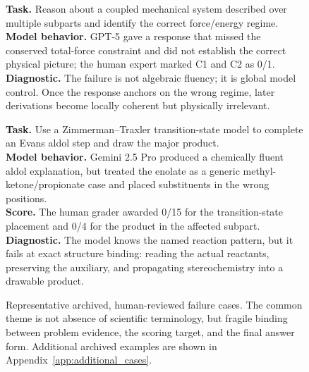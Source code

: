 \documentclass[11pt]{article}
\begin{document}
\begin{figure}[t]
\centering
\begin{tcolorbox}[
  title={Case A: Global physical invariant missed after fluent local reasoning (IPhO 2025 S2 C1--C2)},
  colback=gray!3,
  colframe=black!35,
  boxrule=0.6pt,
  arc=1.5mm,
  left=1.5mm,right=1.5mm,top=1mm,bottom=1mm
]
\footnotesize
\textbf{Task.} Reason about a coupled mechanical system described over multiple subparts and identify the correct force/energy regime.\\
\textbf{Model behavior.} GPT-5 gave a response that missed the conserved total-force constraint and did not establish the correct physical picture; the human expert marked C1 and C2 as 0/1.\\
\textbf{Diagnostic.} The failure is not algebraic fluency; it is global model control. Once the response anchors on the wrong regime, later derivations become locally coherent but physically irrelevant.
\end{tcolorbox}

\vspace{-0.5em}

\begin{tcolorbox}[
  title={Case B: Stereochemical template applied to the wrong substrate (IChO 2025 Q2.2a--b)},
  colback=gray!3,
  colframe=black!35,
  boxrule=0.6pt,
  arc=1.5mm,
  left=1.5mm,right=1.5mm,top=1mm,bottom=1mm
]
\footnotesize
\textbf{Task.} Use a Zimmerman--Traxler transition-state model to complete an Evans aldol step and draw the major product.\\
\textbf{Model behavior.} Gemini 2.5 Pro produced a chemically fluent aldol explanation, but treated the enolate as a generic methyl-ketone/propionate case and placed substituents in the wrong positions.\\
\textbf{Score.} The human grader awarded 0/15 for the transition-state placement and 0/4 for the product in the affected subpart.\\
\textbf{Diagnostic.} The model knows the named reaction pattern, but it fails at exact structure binding: reading the actual reactants, preserving the auxiliary, and propagating stereochemistry into a drawable product.
\end{tcolorbox}

\caption{Representative archived, human-reviewed failure cases. The common theme is not absence of scientific terminology, but fragile binding between problem evidence, the scoring target, and the final answer form. Additional archived examples are shown in Appendix~\ref{app:additional_cases}.}
\label{fig:structure-failure-cases}
\vspace{-0.3cm}
\end{figure}
\end{document}
